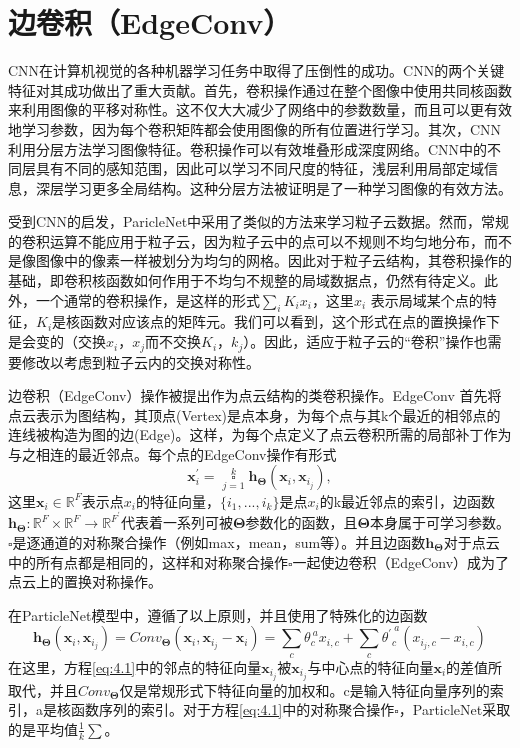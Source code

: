 \section{边卷积（EdgeConv）}
CNN在计算机视觉的各种机器学习任务中取得了压倒性的成功。CNN的两个关键特征对其成功做出了重大贡献。首先，卷积操作通过在整个图像中使用共同核函数来利用图像的平移对称性。这不仅大大减少了网络中的参数数量，而且可以更有效地学习参数，因为每个卷积矩阵都会使用图像的所有位置进行学习。其次，CNN利用分层方法学习图像特征。卷积操作可以有效堆叠形成深度网络。CNN中的不同层具有不同的感知范围，因此可以学习不同尺度的特征，浅层利用局部定域信息，深层学习更多全局结构。这种分层方法被证明是了一种学习图像的有效方法。

受到CNN的启发，ParicleNet中采用了类似的方法来学习粒子云数据。然而，常规的卷积运算不能应用于粒子云，因为粒子云中的点可以不规则不均匀地分布，而不是像图像中的像素一样被划分为均匀的网格。因此对于粒子云结构，其卷积操作的基础，即卷积核函数如何作用于不均匀不规整的局域数据点，仍然有待定义。此外，一个通常的卷积操作，是这样的形式$\sum_{i}K_{i}x_{i}$，这里$x_i$
表示局域某个点的特征，$K_i$是核函数对应该点的矩阵元。我们可以看到，这个形式在点的置换操作下是会变的（交换$x_i$，$x_j$而不交换$K_i$，$k_j$）。因此，适应于粒子云的“卷积”操作也需要修改以考虑到粒子云内的交换对称性。

边卷积（EdgeConv）操作\cite{edgeconv}被提出作为点云结构的类卷积操作。EdgeConv 首先将点云表示为图结构，其顶点(Vertex)是点本身，为每个点与其k个最近的相邻点的连线被构造为图的边(Edge)。这样，为每个点定义了点云卷积所需的局部补丁作为与之相连的最近邻点。每个点的EdgeConv操作有形式
\begin{equation}\label{eq:4.1}
    \bm{x}_{i}^{\prime}=\mathop{\square}\limits_{j=1}^{k}\bm{h}_{\bm{\Theta}}(\bm{x}_{i},\bm{x}_{i_{j}}),
\end{equation}
这里$\bm{x}_{i}\in\mathbb{R}^{F}$表示点$x_i$的特征向量，$\{i_{1},...,i_{k}\}$是点$x_i$的k最近邻点的索引，边函数$\bm{h}_{\bm{\Theta}}:\mathbb{R}^{F}\times\mathbb{R}^{F}\rightarrow\mathbb{R}^{F^{\prime}}$代表着一系列可被$\bm{\Theta}$参数化的函数，且$\bm{\Theta}$本身属于可学习参数。$\square$是逐通道的对称聚合操作（例如max，mean，sum等）。并且边函数$\bm{h_\Theta}$对于点云中的所有点都是相同的，这样和对称聚合操作$\square$一起使边卷积（EdgeConv）成为了点云上的置换对称操作。

在ParticleNet模型中，遵循了以上原则，并且使用了特殊化的边函数
\begin{equation}
    \displaystyle\bm{h}_{\bm{\Theta}}(\bm{x}_{i},\bm{x}_{i_{j}})=\displaystyle{Conv}_{\bm{\Theta}}(\bm{x}_{i},\bm{x}_{i_{j}}-\bm{x}_{i})=\displaystyle\sum_{c}\theta_{c}^{~{}a}x_{i,c}+\sum_{c}{\theta^{\prime}}_{c}^{~{}a}(x_{i_{j},c}-x_{i,c})
\end{equation}
在这里，方程\eqref{eq:4.1}中的邻点的特征向量$\bm{x}_{i_{j}}$被$\bm{x}_{i_{j}}$与中心点的特征向量$\bm{x}_{i}$的差值所取代，并且$Conv_{\bm{\Theta}}$仅是常规形式下特征向量的加权和。c是输入特征向量序列的索引，a是核函数序列的索引。对于方程\eqref{eq:4.1}中的对称聚合操作$\square$，ParticleNet采取的是平均值$\frac{1}{k}\sum$。

